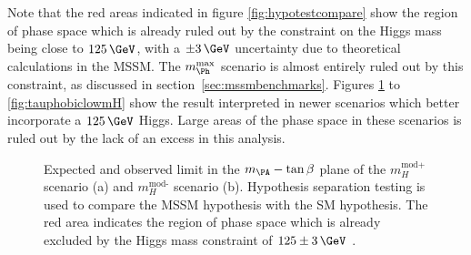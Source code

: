 Note that the red areas indicated in figure \ref{fig:hypotestcompare} show the
region of phase space which is already ruled out by the constraint on the Higgs
mass being close to $125\,\GeV$, with a $\pm 3\,\GeV$ uncertainty due to
theoretical calculations in the \ac{MSSM}. The $m_{\Ph}^{\text{max}}$ scenario
is almost entirely ruled out by this constraint, as discussed in
section~\ref{sec:mssmbenchmarks}. Figures \ref{fig:mhmodpmhmodm} to \ref{fig:tauphobiclowmH}
show the result interpreted in newer scenarios which better incorporate a
$125\,\GeV$ Higgs. Large areas of the phase space in these scenarios is ruled out
by the lack of an excess in this analysis.


\begin{figure}[tbh]
\caption[Expected and observed limit in the $m_{\PA}-\tan\beta$ plane of the
$m_H^{\text{mod+}}$ scenario (a) and $m_H^{\text{mod-}}$ scenario (b).]
{Expected and observed limit in the $m_{\PA}-\tan\beta$ plane of the
$m_H^{\text{mod+}}$ scenario (a) and $m_H^{\text{mod-}}$ scenario (b). Hypothesis
separation testing is used to compare the \ac{MSSM} hypothesis with the \ac{SM}
hypothesis. The red area indicates the region of phase space which is already
excluded by the Higgs mass constraint of $125\pm3\,\GeV$ \cite{HIG-13-021}.}
\label{fig:mhmodpmhmodm}
\end{figure}

